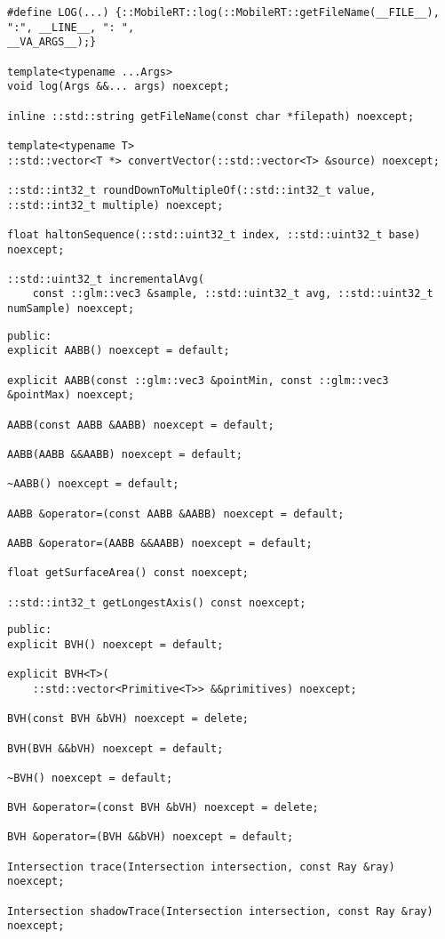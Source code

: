 \begin{lstlisting}[caption={Utils API}, captionpos=b, label=API_Utils]
#define LOG(...) {::MobileRT::log(::MobileRT::getFileName(__FILE__), ":", __LINE__, ": ",
__VA_ARGS__);}

template<typename ...Args>
void log(Args &&... args) noexcept;

inline ::std::string getFileName(const char *filepath) noexcept;

template<typename T>
::std::vector<T *> convertVector(::std::vector<T> &source) noexcept;

::std::int32_t roundDownToMultipleOf(::std::int32_t value, ::std::int32_t multiple) noexcept;

float haltonSequence(::std::uint32_t index, ::std::uint32_t base) noexcept;

::std::uint32_t incrementalAvg(
	const ::glm::vec3 &sample, ::std::uint32_t avg, ::std::uint32_t numSample) noexcept;
\end{lstlisting}

\begin{lstlisting}[caption={AABB API}, captionpos=b, label=API_AABB]
public:
explicit AABB() noexcept = default;

explicit AABB(const ::glm::vec3 &pointMin, const ::glm::vec3 &pointMax) noexcept;

AABB(const AABB &AABB) noexcept = default;

AABB(AABB &&AABB) noexcept = default;

~AABB() noexcept = default;

AABB &operator=(const AABB &AABB) noexcept = default;

AABB &operator=(AABB &&AABB) noexcept = default;

float getSurfaceArea() const noexcept;

::std::int32_t getLongestAxis() const noexcept;
\end{lstlisting}

\begin{lstlisting}[caption={BVH API}, captionpos=b, label=API_BVH]
public:
explicit BVH() noexcept = default;

explicit BVH<T>(
	::std::vector<Primitive<T>> &&primitives) noexcept;

BVH(const BVH &bVH) noexcept = delete;

BVH(BVH &&bVH) noexcept = default;

~BVH() noexcept = default;

BVH &operator=(const BVH &bVH) noexcept = delete;

BVH &operator=(BVH &&bVH) noexcept = default;

Intersection trace(Intersection intersection, const Ray &ray) noexcept;

Intersection shadowTrace(Intersection intersection, const Ray &ray) noexcept;
\end{lstlisting}

